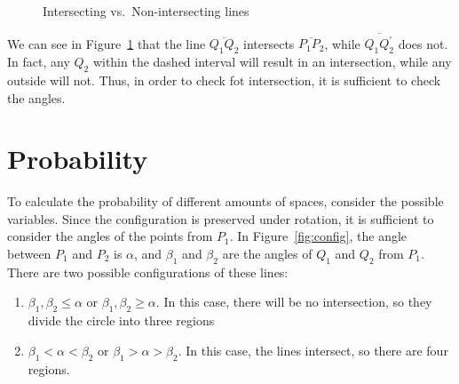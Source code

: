 \documentclass[twocolumn]{article}
\begin{document}
\begin{figure}[h]
\centering
\caption{Intersecting vs.\ Non-intersecting lines}
\label{fig:intersect}
\end{figure}

We can see in Figure~\ref{fig:intersect} that the line $\overline{Q_1 Q_2}$ intersects $\overline{P_1 P_2}$,
while $\overline{Q_1 Q_2^{\prime}}$ does not. In fact, any $Q_2$ within the dashed interval
will result in an intersection, while any outside will not. Thus, in order to check fot intersection, it is sufficient to check the angles.

\section{Probability}

To calculate the probability of different amounts of spaces, consider the possible variables.
Since the configuration is preserved under rotation, it is sufficient to consider the
angles of the points from $P_1$. In Figure~\ref{fig:config}, the angle between 
$P_1$ and $P_2$ is $\alpha$, and $\beta_1$ and $\beta_2$ are the angles of $Q_1$
and $Q_2$ from $P_1$. There are two possible configurations of these lines:

\begin{enumerate}
    \item $\beta_1, \beta_2 \le \alpha$ or $\beta_1, \beta_2 \ge \alpha$.
          In this case, there will be no intersection, so they divide the circle into three regions
    \item $\beta_1 < \alpha < \beta_2$ or $\beta_1 > \alpha > \beta_2$.
          In this case, the lines intersect, so there are four regions.
\end{enumerate}
\end{document}
